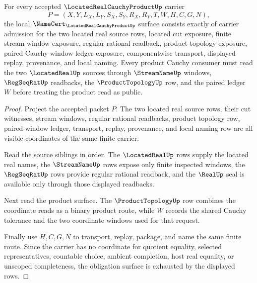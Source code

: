 \begin{theorem}
\label{thm:located-real-cauchy-product-obligation-surface}
For every accepted $\LocatedRealCauchyProductUp$ carrier
$$
P=(X,Y,L_X,L_Y,S_X,S_Y,R_X,R_Y,T,W,H,C,G,N),
$$
the local $\NameCert_{\LocatedRealCauchyProductUp}$ surface consists exactly of carrier admission for the two located real source rows, located cut exposure, finite stream-window exposure, regular rational readback, product-topology exposure, paired Cauchy-window ledger exposure, componentwise transport, displayed replay, provenance, and local naming. Every product Cauchy consumer must read the two $\LocatedRealUp$ sources through $\StreamNameUp$ windows, $\RegSeqRatUp$ readbacks, the $\ProductTopologyUp$ row, and the paired ledger $W$ before treating the product read as public.
\end{theorem}
\begin{proof}
Project the accepted packet $P$. The two located real source rows, their cut witnesses, stream windows, regular rational readbacks, product topology row, paired-window ledger, transport, replay, provenance, and local naming row are all visible coordinates of the same finite carrier.

Read the source siblings in order. The $\LocatedRealUp$ rows supply the located real names, the $\StreamNameUp$ rows expose only finite inspected windows, the $\RegSeqRatUp$ rows provide regular rational readback, and the $\RealUp$ seal is available only through those displayed readbacks.

Next read the product surface. The $\ProductTopologyUp$ row combines the coordinate reads as a binary product route, while $W$ records the shared Cauchy tolerance and the two coordinate windows used for that request.

Finally use $H,C,G,N$ to transport, replay, package, and name the same finite route. Since the carrier has no coordinate for quotient equality, selected representatives, countable choice, ambient completion, host real equality, or unscoped completeness, the obligation surface is exhausted by the displayed rows.
\end{proof}


